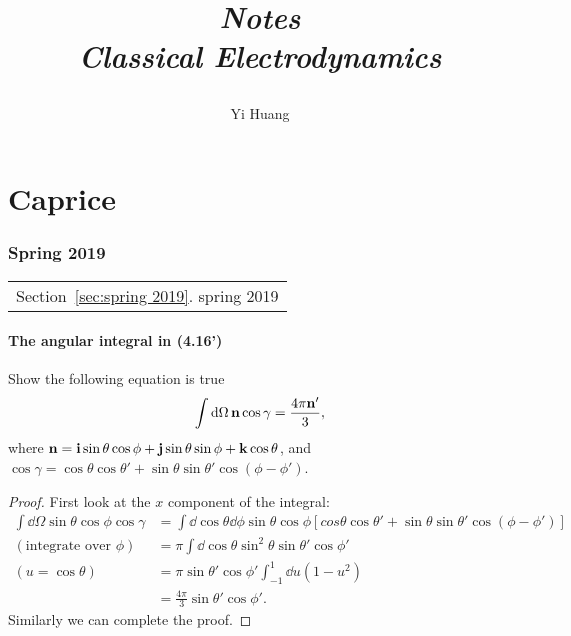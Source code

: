 \documentclass[10pt]{article}
\title{\begin{center}{\Huge \textit{Notes}}\\{{\itshape Classical Electrodynamics}}\end{center}}
\author{Yi Huang}
\affiliation{
University of Minnesota
}
\begin{document}
	\maketitle
	\flushbottom
	\newpage
	\pagestyle{fancynotes}
	\part{Caprice}
	\section{Spring 2019}\label{sec:spring2019}
	\begin{margintable}\vspace{.8in}\footnotesize
		\begin{tabularx}{\marginparwidth}{|X}
		Section~\ref{sec:spring 2019}. spring 2019\\
		\end{tabularx}
	\end{margintable}

\subsection{The angular integral in (4.16')}

Show the following equation is true
\begin{equation}
	\int \dd{\Omega} \vb{n} \cos{\gamma} = \frac{4 \pi \vb{n}'}{3},
\end{equation}
where $\vb{n} = \vb{i} \sin{\theta} \cos{\phi} + \vb{j} \sin{\theta} \sin{\phi} + \vb{k} \cos{\theta}$, and $\cos{\gamma} = \cos{\theta} \cos{\theta'} + \sin{\theta} \sin{\theta'} \cos(\phi - \phi')$.
\begin{proof}
	First look at the $x$ component of the integral:
	\begin{align*}
		\int \dd{\Omega} \sin{\theta} \cos{\phi} \cos{\gamma} &= \int \dd{\cos{\theta}} \dd{\phi} \sin{\theta} \cos{\phi} [cos{\theta} \cos{\theta'} + \sin{\theta} \sin{\theta'} \cos(\phi - \phi')] \\
		(\text{integrate over $\phi$}) &= \pi \int \dd{\cos{\theta}} \sin^2{\theta} \sin{\theta'} \cos{\phi'} \\
		(u = \cos{\theta}) &= \pi \sin{\theta'} \cos{\phi'} \int_{-1}^{1} \dd{u} (1-u^2) \\
		&= \frac{4\pi}{3} \sin{\theta'} \cos{\phi'}.
	\end{align*}
	Similarly we can complete the proof.
\end{proof}
\end{document}
